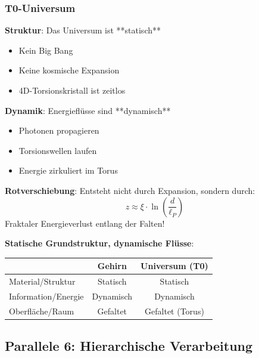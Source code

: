 	\subsubsection{T0-Universum}
	
	\textbf{Struktur}: Das Universum ist **statisch**
	\begin{itemize}
		\item Kein Big Bang
		\item Keine kosmische Expansion
		\item 4D-Torsionskristall ist zeitlos
	\end{itemize}
	
	\textbf{Dynamik}: Energieflüsse sind **dynamisch**
	\begin{itemize}
		\item Photonen propagieren
		\item Torsionswellen laufen
		\item Energie zirkuliert im Torus
	\end{itemize}
	
	\textbf{Rotverschiebung}: Entsteht nicht durch Expansion, sondern durch:
	\begin{equation}
		z \approx \xi \cdot \ln\left(\frac{d}{\ell_P}\right)
	\end{equation}
	Fraktaler Energieverlust entlang der Falten!
	
	\begin{keyresult}
		\textbf{Statische Grundstruktur, dynamische Flüsse}:
		
		\vspace{0.3cm}
		
		\begin{center}
			\begin{tabular}{lcc}
				\toprule
				& \textbf{Gehirn} & \textbf{Universum (T0)} \\
				\midrule
				Material/Struktur & Statisch & Statisch \\
				Information/Energie & Dynamisch & Dynamisch \\
				Oberfläche/Raum & Gefaltet & Gefaltet (Torus) \\
				\bottomrule
			\end{tabular}
		\end{center}
	\end{keyresult}
	
	\subsection{Parallele 6: Hierarchische Verarbeitung}
	
